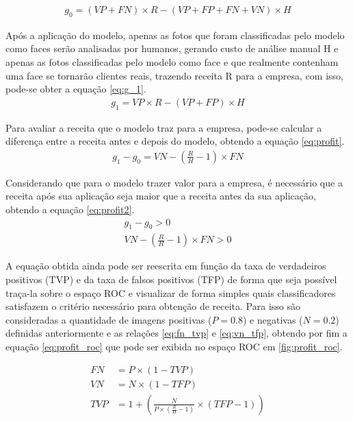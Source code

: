 \begin{align} \label{eq:g_0}
    g_0 = (VP+FN) \times R - (VP+FP+FN+VN) \times H
\end{align}

Após a aplicação do modelo, apenas as fotos que foram classificadas pelo modelo como faces serão analisadas por humanos, gerando custo de análise manual H e apenas as fotos classificadas pelo modelo como face e que realmente contenham uma face se tornarão clientes reais, trazendo receita R para a empresa, com isso, pode-se obter a equação \ref{eq:g_1}.
\begin{align} \label{eq:g_1}
    g_1 = VP \times R - (VP+FP) \times H
\end{align}

Para avaliar a receita que o modelo traz para a empresa, pode-se calcular a diferença entre a receita antes e depois do modelo, obtendo a equação \ref{eq:profit}.
\begin{align} \label{eq:profit}
    g_1 - g_0 = VN - (\frac{R}{H} - 1) \times FN
\end{align}

Considerando que para o modelo trazer valor para a empresa, é necessário que a receita após sua aplicação seja maior que a receita antes da sua aplicação, obtendo a equação \ref{eq:profit2}.
\begin{align} \label{eq:profit2}
    g_1 - g_0 > 0 \\
    VN - (\frac{R}{H} - 1) \times FN > 0
\end{align}

A equação obtida ainda pode ser reescrita em função da taxa de verdadeiros positivos (TVP) e da taxa de falsos positivos (TFP) de forma que seja possível traça-la sobre o espaço ROC e visualizar de forma simples quais classificadores satisfazem o critério necessário para obtenção de receita. Para isso são consideradas a quantidade de imagens positivas ($ P = 0.8 $) e negativas ($ N = 0.2 $) definidas anteriormente e as relações \ref{eq:fn_tvp} e \ref{eq:vn_tfp}, obtendo por fim a equação \ref{eq:profit_roc} que pode ser exibida no espaço ROC em \ref{fig:profit_roc}.

\begin{align} 
    \label{eq:fn_tvp}
    FN &= P \times (1-TVP) \\
    \label{eq:vn_tfp}
    VN &= N \times (1-TFP) \\
    \label{eq:profit_roc}
    TVP &= 1 + \left( \frac{N}{P \times \left( \frac{R}{H}-1 \right) } \times (TFP - 1) \right)
\end{align}

